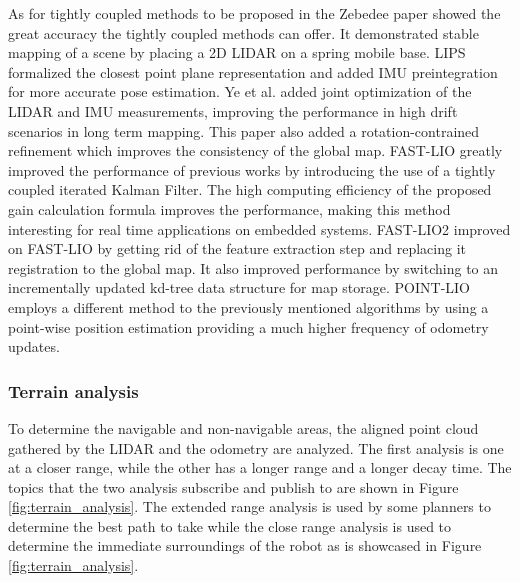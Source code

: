 \documentclass[11pt]{article}
\begin{document}
        As for tightly coupled methods to be proposed in the Zebedee paper \cite{bosse2012zebedee} showed the great accuracy the tightly coupled methods can offer. It demonstrated stable mapping of a scene by placing a 2D LIDAR on a spring mobile base. LIPS \cite{geneva2018lips} formalized the closest point plane representation and added IMU preintegration for more accurate pose estimation. Ye et al. \cite{ye2019tightly} added joint optimization of the LIDAR and IMU measurements, improving the performance in high drift scenarios in long term mapping. This paper also added a rotation-contrained refinement which improves the consistency of the global map.
        FAST-LIO \cite{xu2021fast} greatly improved the performance of previous works by introducing the use of a tightly coupled iterated Kalman Filter. The high computing efficiency of the proposed gain calculation formula improves the performance, making this method interesting for real time applications on embedded systems. FAST-LIO2 \cite{xu2022fast} improved on FAST-LIO by getting rid of the feature extraction step and replacing it registration to the global map. It also improved performance by switching to an incrementally updated kd-tree data structure for map storage. 
        POINT-LIO \cite{he2023point} employs a different method to the previously mentioned algorithms by using a point-wise position estimation providing a much higher frequency of odometry updates.  

        \label{section:etatArt}


        \subsubsection{Terrain analysis}
        \label{section:terrain_analysis}

        To determine the navigable and non-navigable areas, the aligned point cloud gathered by the LIDAR and the odometry are analyzed. The first analysis is one at a closer range, while the other has a longer range and a longer decay time. The topics that the two analysis subscribe and publish to are shown in Figure \ref{fig:terrain_analysis}. The extended range analysis is used by some planners to determine the best path to take while the close range analysis is used to determine the immediate surroundings of the robot as is showcased in Figure \ref{fig:terrain_analysis}.
\end{document}
